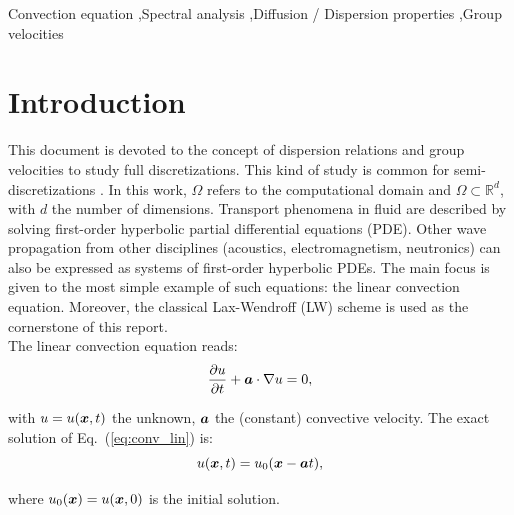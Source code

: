\begin{frontmatter}
\begin{keyword}
Convection equation \sep Spectral analysis \sep Diffusion / Dispersion properties \sep Group velocities
\end{keyword}

\end{frontmatter}


\tableofcontents
\newpage


\section{Introduction \label{sec:intro}}
This document is devoted to the concept of dispersion relations and group velocities to study full discretizations. This kind of study is common for semi-discretizations \cite{Christon:2004,Vichnevetsky:1982}. In this work, $\Omega$ refers to the computational domain and $\Omega \subset \mathbb{R}^d$, with $d$ the number of dimensions. Transport phenomena in fluid are described by solving first-order hyperbolic partial differential equations (PDE). Other wave propagation from other disciplines (acoustics, electromagnetism, neutronics) can also be expressed as systems of first-order hyperbolic PDEs. The main focus is given to the most simple example of such equations: the linear convection equation. Moreover, the classical Lax-Wendroff (LW) scheme is used as the cornerstone of this report. \\

\noindent The linear convection equation reads:
\begin{equation}
\label{eq:conv_lin}
\frac{\partial u}{\partial t} + \boldsymbol{a} \cdot \nabla u = 0, 
\end{equation}

\noindent with $u=u(\boldsymbol{x},t)$ the unknown, $\boldsymbol{a}$ the (constant) convective velocity. The exact solution of Eq.~(\ref{eq:conv_lin}) is:
$$ u(\boldsymbol{x},t) = u_0(\boldsymbol{x} - \boldsymbol{a} t),$$

\noindent where $u_0(\boldsymbol{x}) = u(\boldsymbol{x},0)$ is the initial solution. \\


